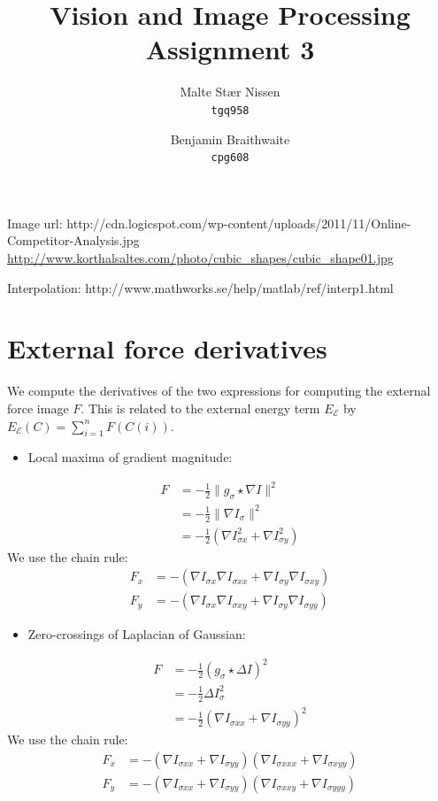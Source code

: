 \documentclass[11pt,a4paper]{article}
\title{Vision and Image Processing\\Assignment 3}
\author{Malte Stær Nissen \\ \texttt{tgq958} \and Benjamin Braithwaite \\
\texttt{cpg608}}
\begin{document}
\maketitle

Image url: http://cdn.logicspot.com/wp-content/uploads/2011/11/Online-Competitor-Analysis.jpg
\url{http://www.korthalsaltes.com/photo/cubic_shapes/cubic_shape01.jpg}

Interpolation: http://www.mathworks.se/help/matlab/ref/interp1.html

\section{External force derivatives}
%
We compute the derivatives of the two expressions for computing the external force image $F$. This is related to the external energy term $E_\mathcal{E}$ by $E_\mathcal{E}(C) = \sum_{i=1}^n F(C(i))$.
\begin{itemize}
\item Local maxima of gradient magnitude:
\end{itemize}
%
\begin{align}
F &= - \frac12 \| g_\sigma \star \nabla I \|^2 \\
&= - \frac12 \| \nabla I_{\sigma} \|^2 \\
&= - \frac12 (\nabla I_{\sigma x}^2 + \nabla I_{\sigma y}^2)
\end{align}
%
We use the chain rule:
%
\begin{align}
F_x &= - (\nabla I_{\sigma x} \nabla I_{\sigma xx} + \nabla I_{\sigma y} \nabla I_{\sigma xy}) \\
F_y &= - (\nabla I_{\sigma x} \nabla I_{\sigma xy} + \nabla I_{\sigma y} \nabla I_{\sigma yy})
\end{align}
%
\begin{itemize}
\item Zero-crossings of Laplacian of Gaussian:
\end{itemize}
%
\begin{align}
F &= - \frac12 ( g_\sigma \star \Delta I)^2 \\
&= - \frac12 \Delta I_{\sigma}^2 \\
&= - \frac12 (\nabla I_{\sigma xx} + \nabla I_{\sigma yy})^2
\end{align}
%
We use the chain rule:
%
\begin{align}
F_x &= - (\nabla I_{\sigma xx} + \nabla I_{\sigma yy}) (\nabla I_{\sigma xxx} + \nabla I_{\sigma xyy}) \\
F_y &= - (\nabla I_{\sigma xx} + \nabla I_{\sigma yy}) (\nabla I_{\sigma xxy} + \nabla I_{\sigma yyy})
\end{align}
%
\end{document}
